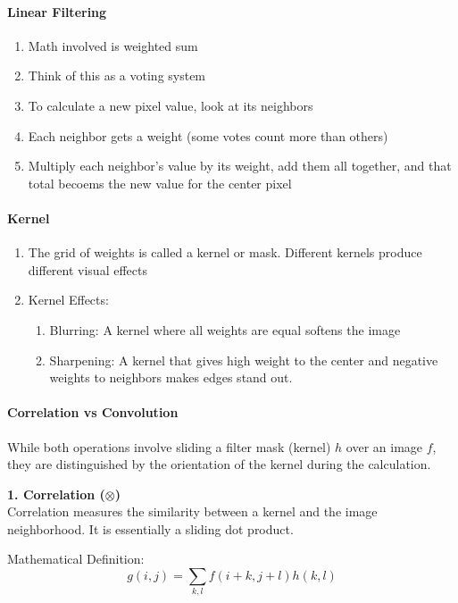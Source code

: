 \documentclass[12pt]{article}
\begin{document}
\paragraph{Linear Filtering}
\begin{enumerate}
    \item Math involved is weighted sum
    \item Think of this as a voting system
    \item To calculate a new pixel value, look at its neighbors
    \item Each neighbor gets a weight (some votes count more than others)
    \item Multiply each neighbor's value by its weight, add them all together, and that total becoems the new value for the center pixel
\end{enumerate}

\paragraph{Kernel}
\begin{enumerate}
    \item The grid of weights is called a kernel or mask. Different kernels produce different visual effects
    \item Kernel Effects:
          \begin{enumerate}
              \item Blurring: A kernel where all weights are equal softens the image
              \item Sharpening: A kernel that gives high weight to the center and negative weights to neighbors makes edges stand out.
          \end{enumerate}
\end{enumerate}

\paragraph{Correlation vs Convolution}

While both operations involve sliding a filter mask (kernel) $h$ over an image $f$, they are distinguished by the orientation of the kernel during the calculation.

\textbf{1. Correlation ($\otimes$)}\\
Correlation measures the similarity between a kernel and the image neighborhood. It is essentially a sliding dot product.

Mathematical Definition:
\[
    g(i,j) = \sum_{k,l} f(i+k, j+l)h(k,l)
\]
\end{document}
